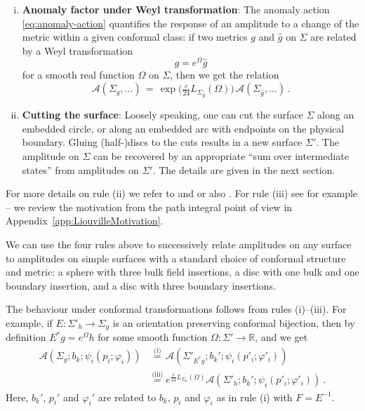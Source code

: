 \documentclass[11pt,a4paper]{article}
\numberwithin{equation}{section}
\begin{document}
\begin{enumerate}[(i)]
    \item \textbf{Anomaly factor under Weyl transformation}: 
    The anomaly action \eqref{eq:anomaly-action} quantifies the response of an amplitude to a change of the metric within a given conformal class: if two metrics $g$ and $\hat{g}$ on $\Sigma$ are related by
    a Weyl transformation
    \begin{equation}
        g = e^\Omega \hat{g}
    \end{equation}
    for a smooth real function $\Omega$ on $\Sigma$,
    then we get the relation
    \begin{equation}\label{eq:AmplLiou} 
        \mathcal{A}(\Sigma_{g},\dots) \,=\, \exp\!\big( \tfrac{c}{24}L_{\Sigma_{\hat{g}}}(\Omega)\big) \,\mathcal{A}(\Sigma_{\hat g},\dots)\,.
    \end{equation}
    
    \item \textbf{Cutting the surface}: Loosely speaking, one can cut the surface $\Sigma$ along an embedded circle, or along an embedded arc with endpoints on the physical boundary. Gluing (half-)discs to the cuts results in a new surface $\Sigma'$. The amplitude on $\Sigma$ can be recovered by an appropriate ``sum over intermediate states'' from amplitudes on $\Sigma'$. The details are given in the next section.
\end{enumerate}
 
For more details on rule (ii) we refer to \cite{Gaberdiel:1994fs} and \cite[Sec.\,5]{Frenkel:2004} or also \cite[Sec.\,2.2]{Brehm:2020zri}.
For rule (iii) see for example \cite{Friedan:1986ua,Gawedzki:1989,Zamolodchikov:2007} -- we review the motivation from the path integral point of view in Appendix~\ref{app:LiouvilleMotivation}.


\smallskip
We can use the four rules above to successively relate amplitudes on any surface to amplitudes on simple surfaces with a standard choice of conformal structure and metric: a sphere with three bulk field insertions, a disc with one bulk and one boundary insertion, and a disc with three boundary insertions.

The behaviour under conformal transformations follows from rules (i)--(iii). For example, if $E : \Sigma'_{h} \to \Sigma_g$ is an orientation preserving conformal bijection, then by definition $E^* g = e^{\Omega} h$ for some smooth function $\Omega : \Sigma' \to \mathbb{R}$, and we get
\begin{align}
        \mathcal{A}\!\left(\Sigma_{g};b_k;\psi_i(p_i;\varphi_i)\right) 
        &\,\overset{\text{(i)}}=\, 
        \mathcal{A}\!\left(\Sigma'_{E^*g};b_k';\psi_i(p'_i;\varphi'_i)\right)
\nonumber\\
        &\overset{\text{(iii)}}= 
        e^{\frac{c}{24}L_{\Sigma_{h}}(\Omega)}
        \mathcal{A}\!\left(\Sigma'_{h};b_k';\psi_i(p'_i;\varphi'_i)\right) \ .
\label{eq:example-amplitude-conformal-transformation}
\end{align}
Here, $b_k'$, $p_i'$ and $\varphi_i'$ are related to $b_k$, $p_i$ and $\varphi_i$ as in rule (i) with $F = E^{-1}$.
\end{document}
